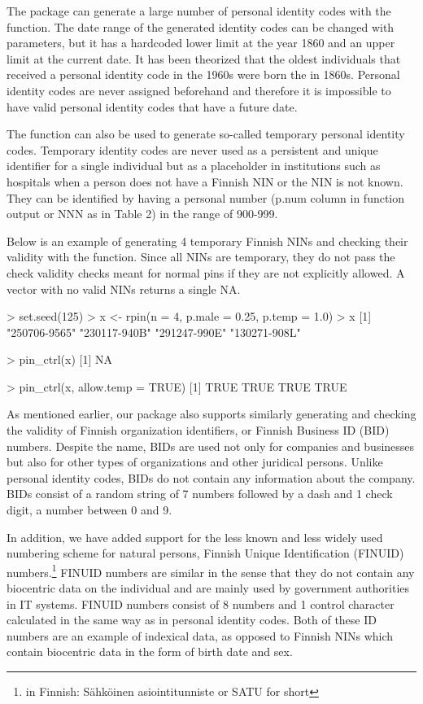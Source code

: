 The  package can generate a large number of personal identity codes with the  function. The date range of the generated identity codes can be changed with parameters, but it has a hardcoded lower limit at the year 1860 and an upper limit at the current date. It has been theorized that the oldest individuals that received a personal identity code in the 1960s were born the in 1860s. Personal identity codes are never assigned beforehand and therefore it is impossible to have valid personal identity codes that have a future date.

The function can also be used to generate so-called temporary personal identity codes. Temporary identity codes are never used as a persistent and unique identifier for a single individual but as a placeholder in institutions such as hospitals when a person does not have a Finnish NIN or the NIN is not known. They can be identified by having a personal number (p.num column in  function output or NNN as in Table 2) in the range of 900-999.

Below is an example of generating 4 temporary Finnish NINs and checking their validity with the  function. Since all NINs are temporary, they do not pass the check validity checks meant for normal pins if they are not explicitly allowed. A vector with no valid NINs returns a single NA.

\begin{example}
  > set.seed(125)
  > x <- rpin(n = 4, p.male = 0.25, p.temp = 1.0)
  > x
  [1] "250706-9565" "230117-940B" "291247-990E" "130271-908L"
  
  > pin_ctrl(x)
  [1] NA
  
  > pin_ctrl(x, allow.temp = TRUE)
  [1] TRUE TRUE TRUE TRUE
\end{example}

As mentioned earlier, our package also supports similarly generating and checking the validity of Finnish organization identifiers, or Finnish Business ID (BID) numbers. Despite the name, BIDs are used not only for companies and businesses but also for other types of organizations and other juridical persons. Unlike personal identity codes, BIDs do not contain any information about the company. BIDs consist of a random string of 7 numbers followed by a dash and 1 check digit, a number between 0 and 9. 

In addition, we have added support for the less known and less widely used numbering scheme for natural persons, Finnish Unique Identification (FINUID) numbers.\footnote{in Finnish: Sähköinen asiointitunniste or SATU for short} FINUID numbers are similar in the sense that they do not contain any biocentric data on the individual and are mainly used by government authorities in IT systems. FINUID numbers consist of 8 numbers and 1 control character calculated in the same way as in personal identity codes. Both of these ID numbers are an example of indexical data, as opposed to Finnish NINs which contain biocentric data in the form of birth date and sex.

